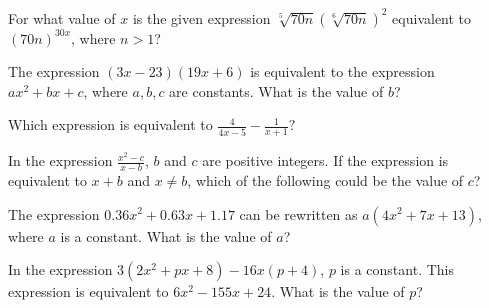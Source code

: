 For what value of \(x\) is the given expression \(\sqrt[5]{70n} \left(\sqrt[6]{70n}\right)^2\) equivalent to \((70n)^{30x}\), where \(n > 1\)?


\vspace{2em}

\noindent\markforreview
\vspace{1em}

The expression \((3x - 23)(19x + 6)\) is equivalent to the expression \(ax^2 + bx + c\), where \(a, b, c\) are constants. What is the value of \(b\)?





\newpage 
\noindent\markforreview
\vspace{1em}

Which expression is equivalent to \(\frac{4}{4x - 5} - \frac{1}{x + 1}?\)

\vspace{0.75em}



\vspace{2em}

\noindent\markforreview
\vspace{1em}

In the expression \(\frac{x^2 - c}{x - b}\), \(b\) and \(c\) are positive integers.  
If the expression is equivalent to \(x + b\) and \(x \ne b\), which of the following could be the value of \(c\)?

\vspace{0.75em}

\newpage
\noindent\markforreview
\vspace{1em}

The expression \(0.36x^2 + 0.63x + 1.17\) can be rewritten as  
\(a(4x^2 + 7x + 13)\), where \(a\) is a constant.  
What is the value of \(a\)?



\vspace{2em}


\noindent\markforreview
\vspace{1em}

In the expression \(3(2x^2 + px + 8) - 16x(p + 4)\),  
\(p\) is a constant. This expression is equivalent to  
\(6x^2 - 155x + 24\). What is the value of \(p\)?

